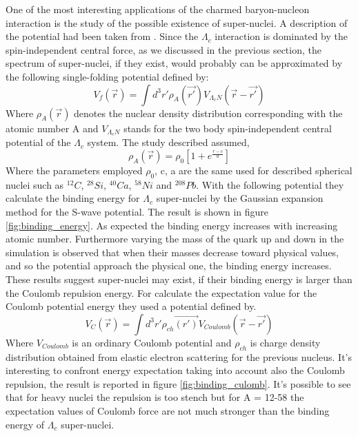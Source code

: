 \documentclass[12pt,a4paper]{book}
\begin{document}
	One of the most interesting applications of the charmed baryon-nucleon interaction is the study of the possible existence of super-nuclei. A description of the potential had been taken from \cite{MIYAMOTO2018113}. Since the $\Lambda_c$ interaction is dominated by the spin-independent central force, as we discussed in the previous section, the spectrum of super-nuclei, if they exist, would probably can be approximated by the following single-folding potential defined by:
	\begin{equation}
		V_f(\vec{r}) = \int d^3r' \rho_A (\vec{r'}) V_{\Lambda_cN} (\vec{r}- \vec{r'}) 
	\end{equation}
	Where $\rho_A(\vec{r})$ denotes the nuclear density distribution corresponding with the atomic number A and $V_{\Lambda_cN}$ stands for the two body spin-independent central potential of the $\Lambda_c$ system. The study described assumed,
	\begin{equation}
		\rho_A(\vec{r})=\rho_0 \left[1+ e^{\frac{r-c}{a}}\right]
	\end{equation}
	Where the parameters employed $\rho_0$, c, a are the same used for described spherical nuclei such as $^{12}C$, $^{28}Si$, $^{40}Ca$, $^{58}Ni$ and $^{208}Pb$.
	With the following potential they calculate the binding energy for $\Lambda_c$ super-nuclei by the Gaussian expansion method for the S-wave potential. The result is shown in figure \ref{fig:binding_energy}. As expected the binding energy increases with increasing atomic number. Furthermore varying the mass of the quark up and down in the simulation is observed that when their masses decrease toward physical values, and so the potential approach the physical one, the binding energy increases. These results suggest super-nuclei may exist, if their binding energy is larger than the Coulomb repulsion energy. For calculate the expectation value for the Coulomb potential energy they used a potential defined by.
	\begin{equation}
		V_C(\vec{r})= \int d^3 r' \rho_{ch}\vec{(r')} V_{Coulomb}(\vec{r}-\vec{r'})
	\end{equation}
	Where $V_{Coulomb}$ is an ordinary Coulomb potential and $\rho_{ch}$ is charge density distribution obtained from elastic electron scattering for the previous nucleus. 
	It's interesting to confront energy expectation taking into account also the Coulomb repulsion, the result is reported in figure \ref{fig:binding_culomb}. It's possible to see that for heavy nuclei the repulsion is too stench but for A = 12-58 the expectation values of Coulomb force are not much stronger than the binding energy of $\Lambda_c$ super-nuclei. 
	
\end{document}
